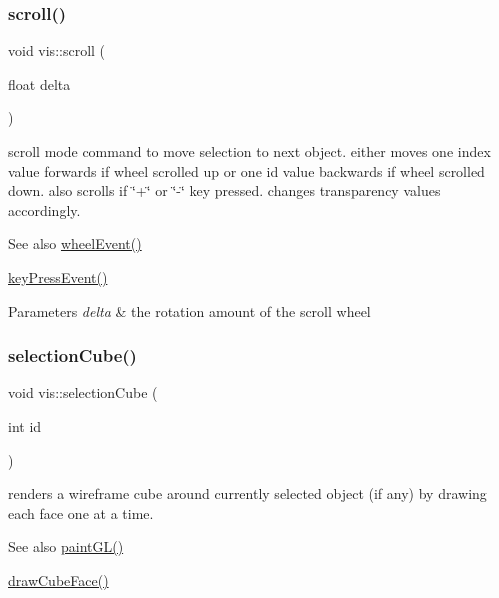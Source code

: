 \subsubsection{\texorpdfstring{scroll()}{scroll()}}
{\footnotesize\ttfamily void vis\+::scroll (\begin{DoxyParamCaption}\item[{float}]{delta }\end{DoxyParamCaption})}

scroll mode command to move selection to next object. either moves one index value forwards if wheel scrolled up or one id value backwards if wheel scrolled down. also scrolls if \char`\"{}+\char`\"{} or \char`\"{}-\/\char`\"{} key pressed. changes transparency values accordingly.

\begin{DoxySeeAlso}{See also}
\mbox{\hyperlink{classvis_afd39fa902cf24e1879d9c4139fb36385}{wheel\+Event()}} 

\mbox{\hyperlink{classvis_a067c6621db4af8a2b34fe00a349b44db}{key\+Press\+Event()}} 
\end{DoxySeeAlso}

\begin{DoxyParams}{Parameters}
{\em delta} & the rotation amount of the scroll wheel \\
\hline
\end{DoxyParams}
\mbox{\label{classvis_a86ece524e0bee2bf1c7741169f4d2ee9}} 
\subsubsection{\texorpdfstring{selection\+Cube()}{selectionCube()}}
{\footnotesize\ttfamily void vis\+::selection\+Cube (\begin{DoxyParamCaption}\item[{int}]{id }\end{DoxyParamCaption})}

renders a wireframe cube around currently selected object (if any) by drawing each face one at a time.

\begin{DoxySeeAlso}{See also}
\mbox{\hyperlink{classvis_ace835462bb98cad495e829c08e1a26ea}{paint\+G\+L()}} 

\mbox{\hyperlink{classvis_a279ffabf91a5426cbfafd520d19edd45}{draw\+Cube\+Face()}} 
\end{DoxySeeAlso}

